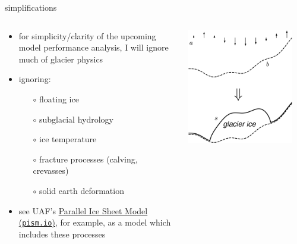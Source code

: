 \documentclass[svgnames,
               hyperref={colorlinks,citecolor=DeepPink4,linkcolor=FireBrick,urlcolor=Maroon},
               usepdftitle=false]  %
               {beamer}
\begin{document}
\begin{frame}{simplifications}

\begin{columns}
\begin{column}{0.6\textwidth}
\begin{itemize}
\item for simplicity/clarity of the upcoming model performance analysis, I will ignore much of glacier physics
\item \alert{ignoring}:
    \begin{itemize}
    \item[$\circ$] floating ice
    \item[$\circ$] subglacial hydrology
    \item[$\circ$] ice temperature
    \item[$\circ$] fracture processes (calving, crevasses)
    \item[$\circ$] solid earth deformation
    \end{itemize}

\medskip
\item<2> {\footnotesize see UAF's \href{https://pism.io/}{Parallel Ice Sheet Model (\texttt{pism.io})}, for example, as a model which includes these processes}
\end{itemize}
\end{column}
\begin{column}{0.42\textwidth}
\hfill \includegraphics[width=0.9\textwidth]{images/map-glacier-ice.png}
\end{column}
\end{columns}
\end{frame}
\end{document}
